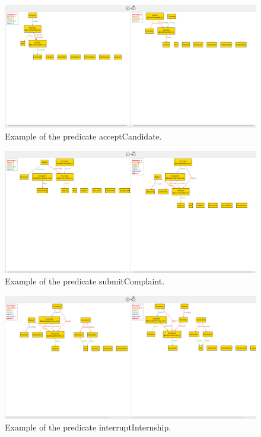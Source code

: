 \begin{figure}[H]
    \begin{center}
        \includegraphics[width=\linewidth]{Images/Alloy/acceptCandidate.png}
        \caption{Example of the predicate acceptCandidate.}
        \label{fig:accept_candidate_alloy}%
    \end{center}
\end{figure}

\begin{figure}[H]
    \begin{center}
        \includegraphics[width=\linewidth]{Images/Alloy/submitComplaint.png}
        \caption{Example of the predicate submitComplaint.}
        \label{fig:submit_complaint_alloy}%
    \end{center}
\end{figure}

\begin{figure}[H]
    \begin{center}
        \includegraphics[width=\linewidth]{RASD//Images//Alloy/interruptInternship.png}
        \caption{Example of the predicate interruptInternship.}
        \label{fig:schedule_intern_alloy}%
    \end{center}
\end{figure}

